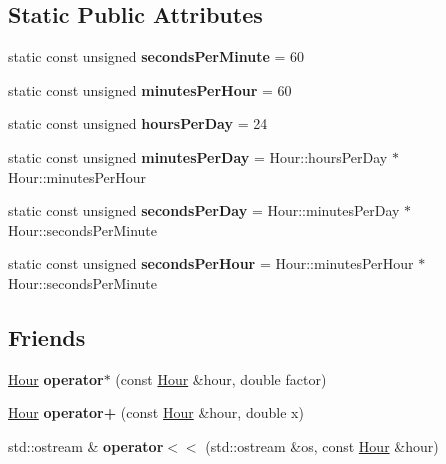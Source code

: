 \subsection*{Static Public Attributes}
\begin{DoxyCompactItemize}
\item 
\hypertarget{class_hour_a564c0da9badbb2e51b882f5655fc4cff}{}static const unsigned {\bfseries seconds\+Per\+Minute} = 60\label{class_hour_a564c0da9badbb2e51b882f5655fc4cff}

\item 
\hypertarget{class_hour_accca3564855b553925b64af70ee735a8}{}static const unsigned {\bfseries minutes\+Per\+Hour} = 60\label{class_hour_accca3564855b553925b64af70ee735a8}

\item 
\hypertarget{class_hour_a03cdb980e42ccbe6897559ff28c51439}{}static const unsigned {\bfseries hours\+Per\+Day} = 24\label{class_hour_a03cdb980e42ccbe6897559ff28c51439}

\item 
\hypertarget{class_hour_aebe16a850ba082b7b5a056ac41aaade9}{}static const unsigned {\bfseries minutes\+Per\+Day} = Hour\+::hours\+Per\+Day $\ast$ Hour\+::minutes\+Per\+Hour\label{class_hour_aebe16a850ba082b7b5a056ac41aaade9}

\item 
\hypertarget{class_hour_af4843be5f00f94cf53ce1770d15d4b77}{}static const unsigned {\bfseries seconds\+Per\+Day} = Hour\+::minutes\+Per\+Day $\ast$ Hour\+::seconds\+Per\+Minute\label{class_hour_af4843be5f00f94cf53ce1770d15d4b77}

\item 
\hypertarget{class_hour_aedcfa9fbea1342493ba563723a01b37c}{}static const unsigned {\bfseries seconds\+Per\+Hour} = Hour\+::minutes\+Per\+Hour $\ast$ Hour\+::seconds\+Per\+Minute\label{class_hour_aedcfa9fbea1342493ba563723a01b37c}

\end{DoxyCompactItemize}
\subsection*{Friends}
\begin{DoxyCompactItemize}
\item 
\hypertarget{class_hour_ac4eba5ff16ebc7f457a494230cd0ac5d}{}\hyperlink{class_hour}{Hour} {\bfseries operator$\ast$} (const \hyperlink{class_hour}{Hour} \&hour, double factor)\label{class_hour_ac4eba5ff16ebc7f457a494230cd0ac5d}

\item 
\hypertarget{class_hour_a5a8828bbd135c58b3a15a30ac2e512e4}{}\hyperlink{class_hour}{Hour} {\bfseries operator+} (const \hyperlink{class_hour}{Hour} \&hour, double x)\label{class_hour_a5a8828bbd135c58b3a15a30ac2e512e4}

\item 
\hypertarget{class_hour_ad5e7eb1ac08edb6d5aad033e54136a5a}{}std\+::ostream \& {\bfseries operator$<$$<$} (std\+::ostream \&os, const \hyperlink{class_hour}{Hour} \&hour)\label{class_hour_ad5e7eb1ac08edb6d5aad033e54136a5a}

\end{DoxyCompactItemize}



